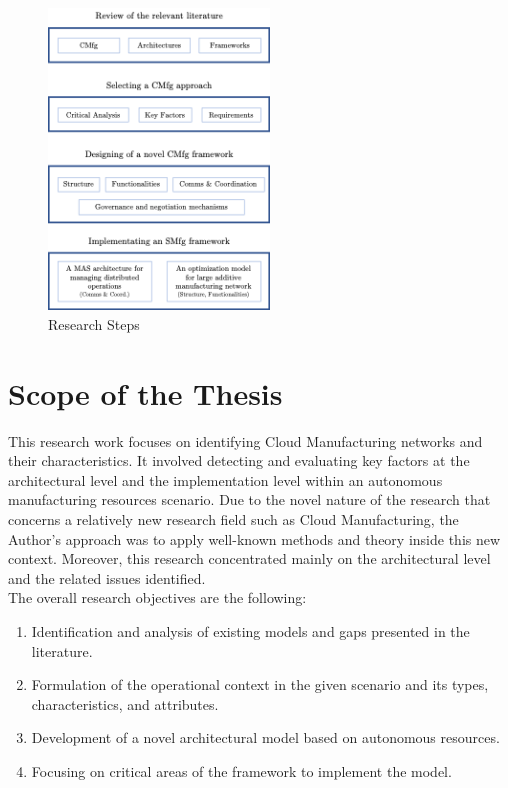 \begin{figure}[h]
    \centering
    \includegraphics[height=8cm,keepaspectratio]{images/research-steps}
    \caption{Research Steps}
    \label{fig:research-steps}
\end{figure}

\section{Scope of the Thesis}
This research work focuses on identifying Cloud Manufacturing networks and their characteristics. It involved detecting and evaluating key factors at the architectural level and the implementation level within an autonomous manufacturing resources scenario. Due to the novel nature of the research that concerns a relatively new research field such as Cloud Manufacturing, the Author's approach was to apply well-known methods and theory inside this new context. Moreover, this research concentrated mainly on the architectural level and the related issues identified.\\
The overall research objectives are the following:
\begin{enumerate}
    \item Identification and analysis of existing models and gaps presented in the literature.
    \item Formulation of the operational context in the given scenario and its types, characteristics, and attributes.
    \item Development of a novel architectural model based on autonomous resources.
    \item Focusing on critical areas of the framework to implement the model.
\end{enumerate}

